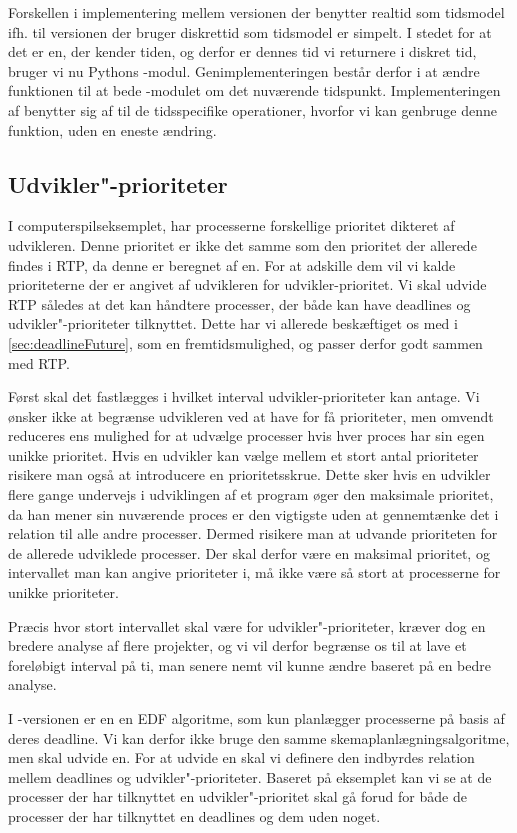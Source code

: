 Forskellen i implementering mellem versionen der benytter realtid som tidsmodel ifh. til versionen der bruger diskrettid som tidsmodel er simpelt. I stedet for at det er \sched en, der kender tiden, og derfor er dennes tid vi returnere i diskret tid, bruger vi nu Pythons -modul. Genimplementeringen består derfor  i at ændre funktionen  til at bede -modulet om det nuværende tidspunkt. Implementeringen af  benytter sig af  til de tidsspecifike operationer, hvorfor vi kan genbruge denne funktion, uden en eneste ændring. 

\subsection{Udvikler"-prioriteter}
I computerspilseksemplet, har processerne forskellige prioritet dikteret af udvikleren. Denne prioritet er ikke det samme som den prioritet der allerede findes i RTP, da denne  er beregnet af \sched en. For at adskille dem vil vi kalde prioriteterne der er angivet af udvikleren for udvikler-prioritet. Vi skal udvide RTP således at det kan håndtere processer, der både kan have deadlines og udvikler"-prioriteter tilknyttet. Dette har vi allerede beskæftiget os med i \cref{sec:deadlineFuture}, som en fremtidsmulighed, og passer derfor godt sammen med RTP.

Først skal det fastlægges i hvilket interval udvikler-prioriteter kan antage. Vi ønsker ikke at begrænse udvikleren ved at have for få prioriteter, men omvendt reduceres \sched ens  mulighed for at udvælge processer hvis hver proces har sin egen unikke prioritet. Hvis en udvikler kan vælge mellem et stort antal prioriteter risikere man også at introducere en prioritetsskrue. Dette sker hvis en udvikler flere gange undervejs i udviklingen af et program øger den maksimale prioritet, da han mener sin nuværende proces er den vigtigste uden at gennemtænke det i relation til alle andre processer. Dermed risikere man at udvande prioriteten for de allerede udviklede processer.  Der skal derfor være en maksimal prioritet, og intervallet man kan angive prioriteter i, må ikke være så stort at processerne for unikke prioriteter.

Præcis  hvor stort intervallet skal være for udvikler"-prioriteter, kræver dog en bredere analyse af flere projekter, og vi vil derfor begrænse os til at lave et foreløbigt interval på ti, man senere nemt vil kunne ændre baseret på en bedre analyse.


I -versionen er \sched en en EDF algoritme, som kun planlægger processerne på basis af deres deadline. Vi kan derfor ikke bruge den samme skemaplanlægningsalgoritme, men skal udvide \sched en. For at udvide \sched en skal vi definere den indbyrdes relation mellem deadlines og udvikler"-prioriteter. Baseret på eksemplet kan vi se at de processer der har  tilknyttet en udvikler"-prioritet skal gå forud for både de processer der har tilknyttet en deadlines og dem uden noget. 

